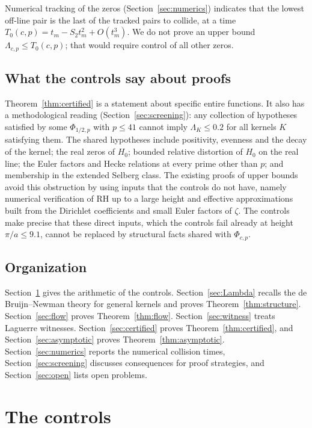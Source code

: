 \documentclass[11pt]{article}
\numberwithin{equation}{section}
\theoremstyle{definition}
\theoremstyle{remark}
\begin{document}
Numerical tracking of the zeros (Section~\ref{sec:numerics}) indicates that
the lowest off-line pair is the last of the tracked pairs to collide, at a time
$T_0(c,p)=t_m-S_2t_m^2+O(t_m^3)$. We do not prove an upper bound
$\Lambda_{c,p}\le T_0(c,p)$; that would require control of all other zeros.

\subsection{What the controls say about proofs}
Theorem~\ref{thm:certified} is a statement about specific entire functions.
It also has a methodological reading (Section~\ref{sec:screening}): any
collection of hypotheses satisfied by some $\Phi_{1/2,p}$ with $p\le41$
cannot imply $\Lambda_K\le0.2$ for all kernels $K$ satisfying them. The
shared hypotheses include positivity, evenness and the decay of the kernel;
the real zeros of $H_0$; bounded relative distortion of $H_0$ on the real
line; the Euler factors and Hecke relations at
every prime other than $p$; and membership in the extended Selberg class. The
existing proofs of upper bounds avoid this obstruction by using inputs that
the controls do not have, namely numerical verification of RH up to a large
height and effective approximations built from the Dirichlet coefficients
and small Euler factors of $\zeta$. The controls make precise that these
direct inputs, which the controls fail already at height $\pi/a\le9.1$,
cannot be replaced by structural facts shared with $\Phi_{c,p}$.

\subsection{Organization}
Section~\ref{sec:controls} gives the arithmetic of the controls.
Section~\ref{sec:Lambda} recalls the de Bruijn--Newman theory for general
kernels and proves Theorem~\ref{thm:structure}. Section~\ref{sec:flow}
proves Theorem~\ref{thm:flow}. Section~\ref{sec:witness} treats Laguerre
witnesses. Section~\ref{sec:certified} proves Theorem~\ref{thm:certified},
and Section~\ref{sec:asymptotic} proves Theorem~\ref{thm:asymptotic}.
Section~\ref{sec:numerics} reports the numerical collision times,
Section~\ref{sec:screening} discusses consequences for proof strategies, and
Section~\ref{sec:open} lists open problems.

\section{The controls}\label{sec:controls}
\end{document}
